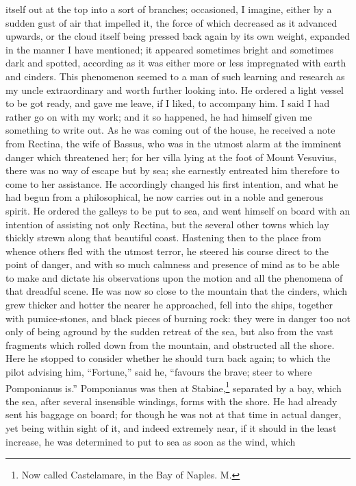itself out at the top into a sort of branches; occasioned, I imagine,
either by a sudden gust of air that impelled it, the force of which
decreased as it advanced upwards, or the cloud itself being pressed back
again by its own weight, expanded in the manner I have mentioned; it
appeared sometimes bright and sometimes dark and spotted, according as it
was either more or less impregnated with earth and cinders. This
phenomenon seemed to a man of such learning and research as my uncle
extraordinary and worth further looking into. He ordered a light vessel to
be got ready, and gave me leave, if I liked, to accompany him. I said I
had rather go on with my work; and it so happened, he had himself given me
something to write out. As he was coming out of the house, he received a
note from Rectina, the wife of Bassus, who was in the utmost alarm at the
imminent danger which threatened her; for her villa lying at the foot of
Mount Vesuvius, there was no way of escape but by sea; she earnestly
entreated him therefore to come to her assistance. He accordingly changed
his first intention, and what he had begun from a philosophical, he now
carries out in a noble and generous spirit. He ordered the galleys to be
put to sea, and went himself on board with an intention of assisting not
only Rectina, but the several other towns which lay thickly strewn along
that beautiful coast. Hastening then to the place from whence others fled
with the utmost terror, he steered his course direct to the point of
danger, and with so much calmness and presence of mind as to be able to
make and dictate his observations upon the motion and all the phenomena of
that dreadful scene. He was now so close to the mountain that the cinders,
which grew thicker and hotter the nearer he approached, fell into the
ships, together with pumice-stones, and black pieces of burning rock: they
were in danger too not only of being aground by the sudden retreat of the
sea, but also from the vast fragments which rolled down from the mountain,
and obstructed all the shore. Here he stopped to consider whether he
should turn back again; to which the pilot advising him, ``Fortune,'' said
he, ``favours the brave; steer to where Pomponianus is.'' Pomponianus was
then at Stabiae,\footnote{Now called Castelamare,
in the Bay of Naples. M.} separated by a bay, which the sea, after
several insensible windings, forms with the shore. He had already sent his
baggage on board; for though he was not at that time in actual danger, yet
being within sight of it, and indeed extremely near, if it should in the
least increase, he was determined to put to sea as soon as the wind, which
